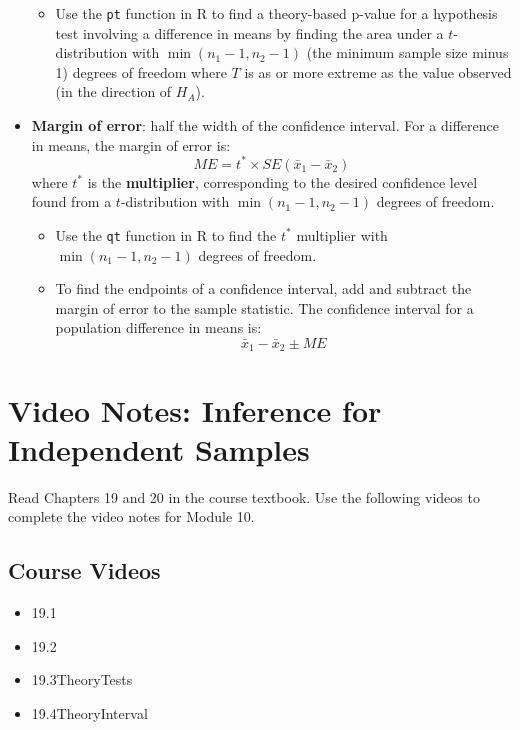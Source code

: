 \documentclass[
]{report}
\providecommand{\tightlist}{%
  \setlength{\itemsep}{0pt}\setlength{\parskip}{0pt}}
\begin{document}
\begin{itemize}
  \begin{itemize}
  \tightlist
  \item
    Use the \texttt{pt} function in R to find a theory-based p-value for a hypothesis test involving a difference in means by finding the area under a \(t\)-distribution with \(\min(n_1-1, n_2-1)\) (the minimum sample size minus 1) degrees of freedom where \(T\) is as or more extreme as the value observed (in the direction of \(H_A\)).
  \end{itemize}
\item
  \textbf{Margin of error}: half the width of the confidence interval. For a difference in means, the margin of error is:
  \[ME = t^* \times SE(\bar{x}_1 - \bar{x}_2)\]
  where \(t^*\) is the \textbf{multiplier}, corresponding to the desired confidence level found from a \(t\)-distribution with \(\min(n_1-1, n_2-1)\) degrees of freedom.

  \begin{itemize}
  \item
    Use the \texttt{qt} function in R to find the \(t^*\) multiplier with \(\min(n_1-1, n_2-1)\) degrees of freedom.
  \item
    To find the endpoints of a confidence interval, add and subtract the margin of error to the sample statistic. The confidence interval for a population difference in means is:
    \[\bar{x}_1 - \bar{x}_2 \pm ME\]
  \end{itemize}
\end{itemize}

\newpage

\section{Video Notes: Inference for Independent Samples}\label{video-notes-inference-for-independent-samples}

Read Chapters 19 and 20 in the course textbook. Use the following videos to complete the video notes for Module 10.

\subsection{Course Videos}\label{course-videos-9}

\begin{itemize}
\item
  19.1
\item
  19.2
\item
  19.3TheoryTests
\item
  19.4TheoryInterval
\end{itemize}
\end{document}
